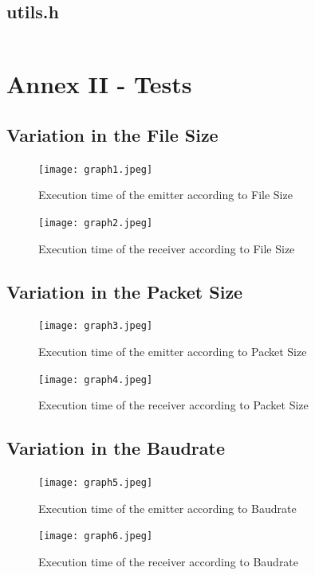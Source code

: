 \documentclass[11pt]{article}
\begin{document}
\inputminted{c}{utils.c}

\newpage

\subsection*{utils.h}

\inputminted{c}{utils.h}

\section*{Annex II - Tests}

\subsection*{Variation in the File Size}

\begin{figure}[h]
    \centering
    \texttt{[image: graph1.jpeg]}
    \caption{Execution time of the emitter according to File Size}
\end{figure}

\begin{figure}[h]
    \centering
    \texttt{[image: graph2.jpeg]}
    \caption{Execution time of the receiver according to File Size}
\end{figure}

\newpage

\subsection*{Variation in the Packet Size}

\begin{figure}[h]
    \centering
    \texttt{[image: graph3.jpeg]}
    \caption{Execution time of the emitter according to Packet Size}
\end{figure}

\begin{figure}[h]
    \centering
    \texttt{[image: graph4.jpeg]}
    \caption{Execution time of the receiver according to Packet Size}
\end{figure}

\newpage

\subsection*{Variation in the Baudrate}

\begin{figure}[h]
    \centering
    \texttt{[image: graph5.jpeg]}
    \caption{Execution time of the emitter according to Baudrate}
\end{figure}

\begin{figure}[h]
    \centering
    \texttt{[image: graph6.jpeg]}
    \caption{Execution time of the receiver according to Baudrate}
\end{figure}
\end{document}
